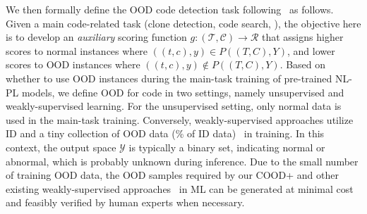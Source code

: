 We then formally define the OOD code detection task following~\cite{hsu2020generalized, liu2020energy, tian2020few, kim-etal-2023-pseudo} as follows. Given a main code-related task (\eg clone detection, code search, \etc), the objective here is to develop an \textit{auxiliary} scoring function $g: \mathcal{(T, C)} \rightarrow \mathcal{R}$ that assigns higher scores to normal instances where $ ((t, c), y) \in P((T, C),Y)$, and lower scores to OOD instances where $((t, c), y) \notin P((T, C),Y)$. Based on whether to use OOD instances during the main-task training of pre-trained NL-PL models, we define OOD for code in two settings, namely unsupervised and weakly-supervised learning. For the unsupervised setting, only normal data is used in the main-task training. Conversely, weakly-supervised approaches utilize ID and a tiny collection of OOD data (\% of ID data)~\cite{tian2020few} in training. In this context, the output space $\mathcal{Y}$ is typically a binary set, indicating normal or abnormal, which is probably unknown during inference. Due to the small number of training OOD data, the OOD samples required by our COOD+ and other existing weakly-supervised approaches~\cite{ruff2020deep, tian2020few} in ML can be generated at minimal cost and feasibly verified by human experts when necessary.




